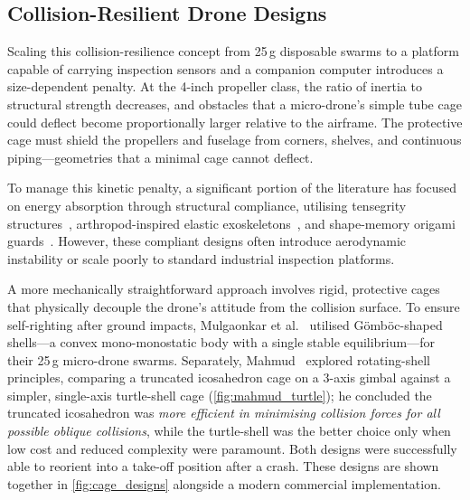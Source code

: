 \subsection{Collision-Resilient Drone Designs}

Scaling this collision-resilience concept from 25\,g disposable swarms to a platform capable of carrying inspection sensors and a companion computer introduces a size-dependent penalty. At the 4-inch propeller class, the ratio of inertia to structural strength decreases, and obstacles that a micro-drone's simple tube cage could deflect become proportionally larger relative to the airframe. The protective cage must shield the propellers and fuselage from corners, shelves, and continuous piping---geometries that a minimal cage cannot deflect.

To manage this kinetic penalty, a significant portion of the literature has focused on energy absorption through structural compliance, utilising tensegrity structures~\cite{zhaDesignControlCollisionresilient2023}, arthropod-inspired elastic exoskeletons~\cite{azambujaWhenBeingSoft2022}, and shape-memory origami guards~\cite{parkOrigamiKirigamiStructure2023}. However, these compliant designs often introduce aerodynamic instability or scale poorly to standard industrial inspection platforms.

A more mechanically straightforward approach involves rigid, protective cages that physically decouple the drone's attitude from the collision surface. To ensure self-righting after ground impacts, Mulgaonkar et al.~\cite{mulgaonkarRobustAerialRobot2018} utilised G\"omb\"oc-shaped shells---a convex mono-monostatic body with a single stable equilibrium---for their 25\,g micro-drone swarms. Separately, Mahmud~\cite{mahmudDevelopmentCollisionResilient2021} explored rotating-shell principles, comparing a truncated icosahedron cage on a 3-axis gimbal against a simpler, single-axis turtle-shell cage (\autoref{fig:mahmud_turtle}); he concluded the truncated icosahedron was \emph{more efficient in minimising collision forces for all possible oblique collisions}, while the turtle-shell was the better choice only when low cost and reduced complexity were paramount. Both designs were successfully able to reorient into a take-off position after a crash. These designs are shown together in \autoref{fig:cage_designs} alongside a modern commercial implementation.

